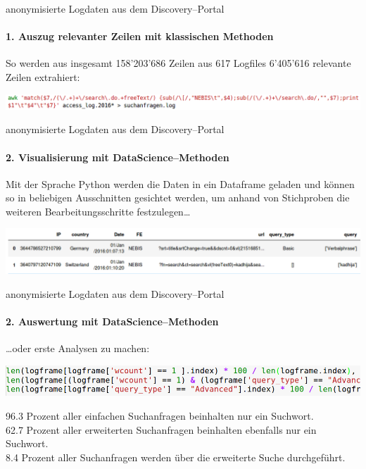 \begin{frame}{anonymisierte Logdaten aus dem Discovery--Portal}
  \framesubtitle{1. Auszug relevanter Zeilen mit klassischen Methoden}
  So werden aus insgesamt 158'203'686 Zeilen aus 617 Logfiles 6'405'616 relevante Zeilen extrahiert:
  \begin{center}
    \includegraphics[width=1\textwidth]{pics/bsp-awk}
  \end{center}
\end{frame}

\begin{frame}{anonymisierte Logdaten aus dem Discovery--Portal}
  \framesubtitle{2. Visualisierung mit DataScience--Methoden}
  Mit der Sprache Python werden die Daten in ein Dataframe geladen und können so in beliebigen Ausschnitten gesichtet werden, um anhand von Stichproben die weiteren Bearbeitungsschritte festzulegen\ldots
  \begin{center}
    \includegraphics[width=1\textwidth]{pics/Ausschnitt_Dataframe}
  \end{center}
\end{frame}

\begin{frame}{anonymisierte Logdaten aus dem Discovery--Portal}
  \framesubtitle{2. Auswertung mit DataScience--Methoden}
  \ldots oder erste Analysen zu machen:
  \begin{center}
    \includegraphics[width=1\textwidth]{pics/erste_Auswertung}
  \end{center}
  96.3 Prozent aller einfachen Suchanfragen beinhalten nur ein Suchwort.\\
  62.7 Prozent aller erweiterten Suchanfragen beinhalten ebenfalls nur ein Suchwort.\\
  8.4 Prozent aller Suchanfragen werden über die erweiterte Suche durchgeführt.
\end{frame}


